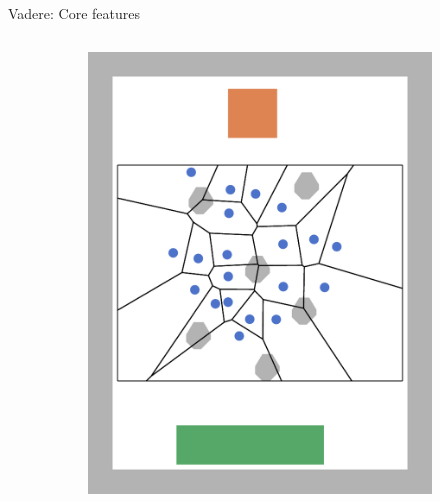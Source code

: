 \documentclass[compress,t,usenames,xcolor=dvipsnames]{beamer}
\begin{document}
\begin{frame}{Vadere: Core features \hfill \hyperlink{BackupSlides}{}}
\begin{columns}
\begin{column}{0.45\textwidth}
{\begin{figure}
\begin{subfigure}{0.475\textwidth}
                        \includegraphics[width=\textwidth]{VadereFeatures/Vadere-PostVisualization-VoronoiDiagram}
                    \end{subfigure}
                    \label{fig:VadereScreenshots}
                \end{figure}
            }
\end{column}
\end{columns}
\end{frame}
\end{document}
